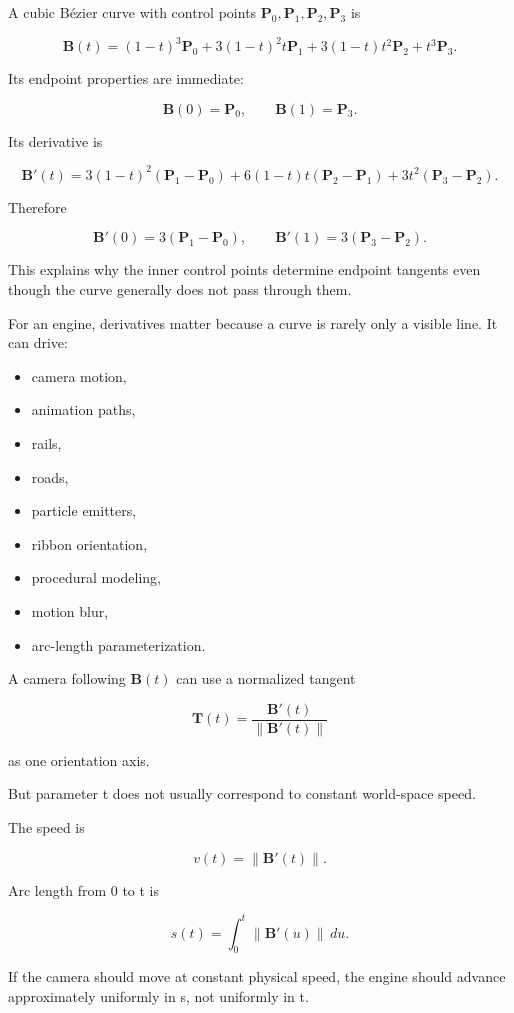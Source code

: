 A cubic Bézier curve with control points \(\mathbf P_0,\mathbf P_1,\mathbf P_2,\mathbf P_3\) is

\[
\mathbf B(t)
=
(1-t)^3\mathbf P_0
+
3(1-t)^2t\mathbf P_1
+
3(1-t)t^2\mathbf P_2
+
t^3\mathbf P_3.
\]

Its endpoint properties are immediate:

\[
\mathbf B(0)=\mathbf P_0,
\qquad
\mathbf B(1)=\mathbf P_3.
\]

Its derivative is

\[
\mathbf B'(t)
=
3(1-t)^2(\mathbf P_1-\mathbf P_0)
+
6(1-t)t(\mathbf P_2-\mathbf P_1)
+
3t^2(\mathbf P_3-\mathbf P_2).
\]

Therefore

\[
\mathbf B'(0)=3(\mathbf P_1-\mathbf P_0),
\qquad
\mathbf B'(1)=3(\mathbf P_3-\mathbf P_2).
\]

This explains why the inner control points determine endpoint tangents even though the curve generally does not pass through them.

For an engine, derivatives matter because a curve is rarely only a visible line. It can drive:

\begin{itemize}
\tightlist
\item
  camera motion,
\item
  animation paths,
\item
  rails,
\item
  roads,
\item
  particle emitters,
\item
  ribbon orientation,
\item
  procedural modeling,
\item
  motion blur,
\item
  arc-length parameterization.
\end{itemize}

A camera following \(\mathbf B(t)\) can use a normalized tangent

\[
\mathbf T(t)=
\frac{\mathbf B'(t)}
{\|\mathbf B'(t)\|}
\]

as one orientation axis.

But parameter t does not usually correspond to constant world-space speed.

The speed is

\[
v(t)=\|\mathbf B'(t)\|.
\]

Arc length from 0 to t is

\[
s(t)=\int_0^t\|\mathbf B'(u)\|\,du.
\]

If the camera should move at constant physical speed, the engine should advance approximately uniformly in s, not uniformly in t.

